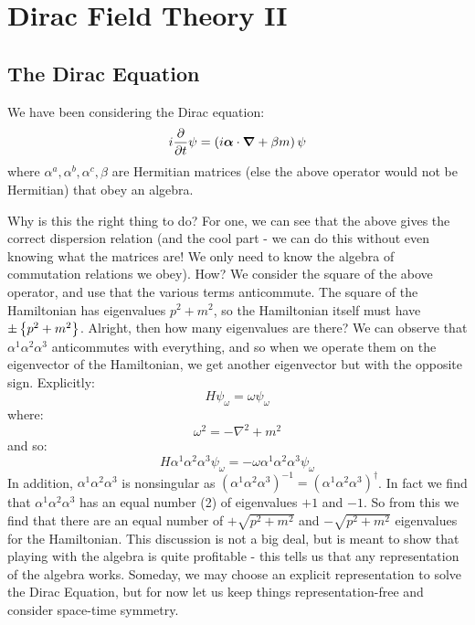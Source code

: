 \section{Dirac Field Theory II}
\subsection{The Dirac Equation}
We have been considering the Dirac equation:
\begin{equation}
    i\dpd{}{t}\psi = \left(i\gv{\alpha}\cdot\nabla + \beta m\right)\psi
\end{equation}
where $\alpha^a, \alpha^b, \alpha^c, \beta$ are Hermitian matrices (else the above operator would not be Hermitian) that obey an algebra. 

Why is this the right thing to do? For one, we can see that the above gives the correct dispersion relation (and the cool part - we can do this without even knowing what the matrices are! We only need to know the algebra of commutation relations we obey). How? We consider the square of the above operator, and use that the various terms anticommute. The square of the Hamiltonian has eigenvalues $p^2 + m^2$, so the Hamiltonian itself must have $\pm \set{p^2 + m^2}$. Alright, then how many eigenvalues are there? We can observe that $\alpha^1\alpha^2\alpha^3$ anticommutes with everything, and so when we operate them on the eigenvector of the Hamiltonian, we get another eigenvector but with the opposite sign. Explicitly:
\begin{equation}
    H\psi_\omega = \omega\psi_\omega
\end{equation}
where:
\begin{equation}
    \omega^2 = -\nabla^2 + m^2
\end{equation}
and so:
\begin{equation}
    H\alpha^1\alpha^2\alpha^3\psi_\omega = -\omega\alpha^1\alpha^2\alpha^3\psi_\omega
\end{equation}
In addition, $\alpha^1\alpha^2\alpha^3$ is nonsingular as $(\alpha^1\alpha^2\alpha^3)^{-1} = (\alpha^1\alpha^2\alpha^3)^\dag$. In fact we find that $\alpha^1\alpha^2\alpha^3$ has an equal number (2) of eigenvalues $+1$ and $-1$. So from this we find that there are an equal number of $+\sqrt{p^2 + m^2}$ and $-\sqrt{p^2 + m^2}$ eigenvalues for the Hamiltonian. This discussion is not a big deal, but is meant to show that playing with the algebra is quite profitable - this tells us that any representation of the algebra works. Someday, we may choose an explicit representation to solve the Dirac Equation, but for now let us keep things representation-free and consider space-time symmetry.

